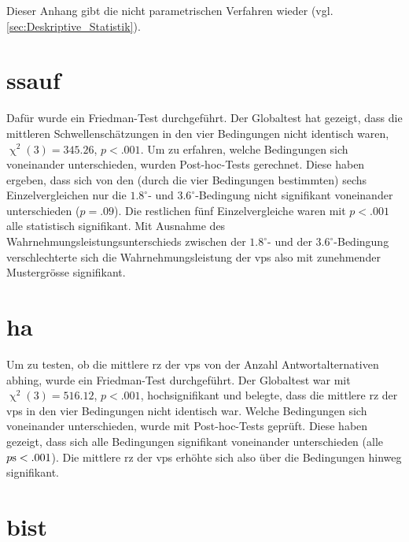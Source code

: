 \documentclass[11pt, twoside, a4paper]{book}		%
\begin{document}
Dieser Anhang gibt die nicht parametrischen Verfahren wieder (vgl. \autoref{sec:Deskriptive_Statistik}).

\section{\gls{ssauf}}


Dafür wurde ein Friedman-Test durchgeführt. Der Globaltest hat gezeigt, dass die mittleren Schwellenschätzungen in den vier Bedingungen nicht identisch waren, $\upchi^2(3)=345.26$, $p<.001$. 
Um zu erfahren, welche Bedingungen sich voneinander unterschieden, wurden Post-hoc-Tests \citep{Galili2010, Hollander2014} gerechnet. Diese haben ergeben, dass sich von den (durch die vier Bedingungen bestimmten) sechs Einzelvergleichen nur die $1.8^{\circ}$- und $3.6^{\circ}$-Bedingung nicht signifikant voneinander unterschieden ($p=.09$). Die restlichen fünf Einzelvergleiche waren mit $p<.001$ alle statistisch signifikant.
Mit Ausnahme des Wahrnehmungsleistungsunterschieds zwischen der $1.8^{\circ}$- und der $3.6^{\circ}$-Bedingung verschlechterte sich die Wahrnehmungsleistung der \glspl{vp} also mit zunehmender Mustergrösse signifikant.

\section{\gls{ha}}

Um zu testen, ob die mittlere \gls{rz} der \glspl{vp} von der Anzahl Antwortalternativen abhing, wurde ein Friedman-Test durchgeführt. Der Globaltest war mit $\upchi^2(3)=516.12$, $p<.001$, hochsignifikant und belegte, dass die mittlere \gls{rz} der \glspl{vp} in den vier Bedingungen nicht identisch war. Welche Bedingungen sich voneinander unterschieden, wurde mit Post-hoc-Tests \citep{Galili2010, Hollander2014} geprüft. Diese haben gezeigt, dass sich alle Bedingungen signifikant voneinander unterschieden (alle $p\textnormal{s}<.001$). Die mittlere \gls{rz} der \glspl{vp} erhöhte sich also über die Bedingungen hinweg signifikant.

\section{\gls{bist}}
\end{document}
